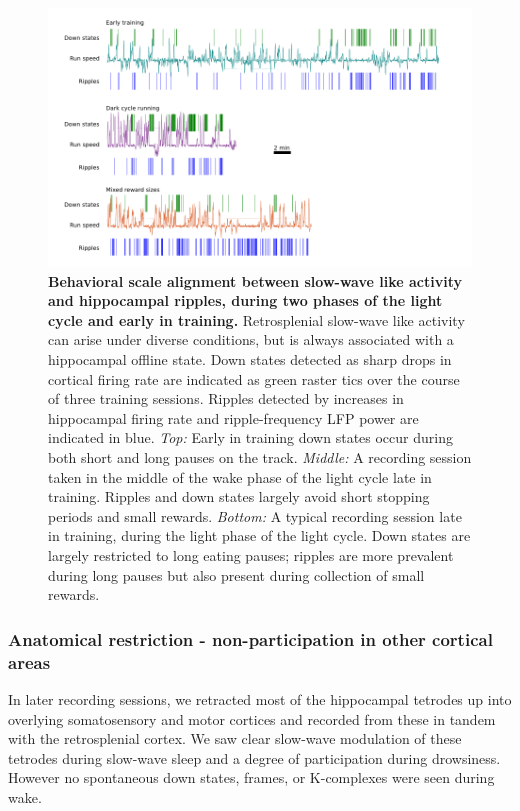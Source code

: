 \documentclass[]{article}
\begin{document}
\begin{figure}[htbp]
\centering
\includegraphics{./finalFigs/SWW/manyLongExamples.png}
\caption{\textbf{Behavioral scale alignment between slow-wave like
activity and hippocampal ripples, during two phases of the light cycle
and early in training.} Retrosplenial slow-wave like activity can arise
under diverse conditions, but is always associated with a hippocampal
offline state. Down states detected as sharp drops in cortical firing
rate are indicated as green raster tics over the course of three
training sessions. Ripples detected by increases in hippocampal firing
rate and ripple-frequency LFP power are indicated in blue. \emph{Top:}
Early in training down states occur during both short and long pauses on
the track. \emph{Middle:} A recording session taken in the middle of the
wake phase of the light cycle late in training. Ripples and down states
largely avoid short stopping periods and small rewards. \emph{Bottom:} A
typical recording session late in training, during the light phase of
the light cycle. Down states are largely restricted to long eating
pauses; ripples are more prevalent during long pauses but also present
during collection of small rewards.}
\end{figure}

\subsubsection{Anatomical restriction - non-participation in other
cortical areas}

In later recording sessions, we retracted most of the hippocampal
tetrodes up into overlying somatosensory and motor cortices and recorded
from these in tandem with the retrosplenial cortex. We saw clear
slow-wave modulation of these tetrodes during slow-wave sleep and a
degree of participation during drowsiness. However no spontaneous down
states, frames, or K-complexes were seen during wake.
\end{document}
